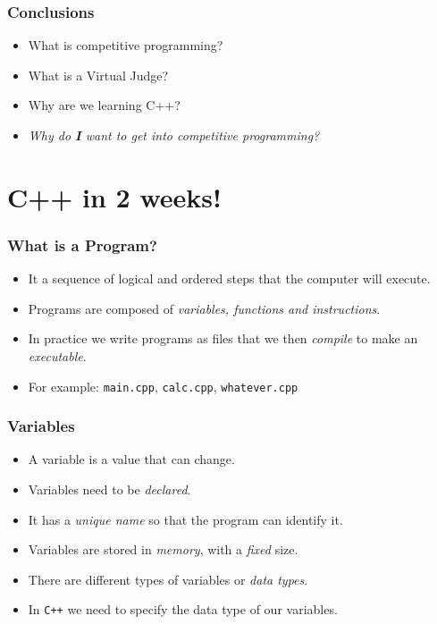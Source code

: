 \documentclass{beamer}
\begin{document}
\begin{frame}
    \frametitle{Conclusions}

    \begin{itemize}
        \item What is competitive programming?
        \item What is a Virtual Judge?
        \item Why are we learning C++?
        \item \emph{Why do \textbf{I} want to get into competitive programming?}
    \end{itemize}
\end{frame}

\section{C++ in 2 weeks!}

\begin{frame}
    \frametitle{What is a Program?}

    \begin{itemize}
        \item It a sequence of logical and ordered steps that the computer will execute.
        \item Programs are composed of \textit{variables, functions and instructions}.
        \item In practice we write programs as files that we then \textit{compile} to make an \textit{executable}.
        \item For example: \texttt{main.cpp}, \texttt{calc.cpp}, \texttt{whatever.cpp}
    \end{itemize}
\end{frame}

\begin{frame}
    \frametitle{Variables}

    \begin{itemize}
        \item A variable is a value that can change.
        \item Variables need to be \textit{declared}.
        \item It has a \textit{unique name} so that the program can identify it.
        \item Variables are stored in \textit{memory}, with a \textit{fixed} size.
        \item There are different types of variables or \textit{data types}.
        \item In \texttt{C++} we need to specify the data type of our variables.
    \end{itemize}
\end{frame}
\end{document}

